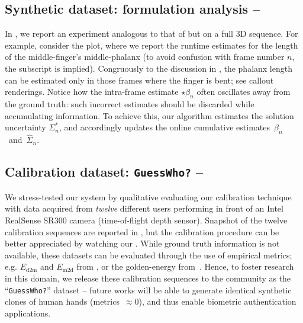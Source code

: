\subsection{Synthetic dataset: formulation analysis -- }
\label{sec:analysis}
In , we report an experiment analogous to that of  but on a full 3D sequence. For example, consider the {\small \todo{$\beta_{[?]}$}} plot, where we report the runtime estimates for the length of the middle-finger's middle-phalanx (to avoid confusion with frame number $n$, the \todo{{\scriptsize $[?]$}} subscript is implied). Congruously to the discussion in , the phalanx length can be estimated only in those frames where the finger is bent; see callout renderings.
Notice how the intra-frame estimate {\small $\star\beta_n$} often oscillates away from the ground truth: 
such incorrect estimates should be discarded while accumulating information. To achieve this, our algorithm estimates the solution uncertainty {\small $\Sigma^*_n$}, and accordingly updates the online cumulative estimates~{\small $\hat\beta_n$}~and~{\small $\hat\Sigma_n$}.

\subsection{Calibration dataset: \texttt{GuessWho?} -- }
\label{sec:evaldataset}
We stress-tested our system by qualitative evaluating our calibration technique with data acquired from \emph{twelve} different users performing in front of an Intel RealSense SR300 camera (time-of-flight depth sensor). 
Snapshot of the twelve calibration sequences are reported in , but the calibration procedure can be better appreciated by watching our \VideoQualitative{}.
While ground truth information is not available, these datasets can be evaluated through the use of empirical metrics; e.g. $E_\text{d2m}$ and $E_\text{m2d}$ from \cite{tkach2016sphere}, or the golden-energy from~\cite{taylor2016joint}.
Hence, to foster research in this domain, we release these calibration sequences to the community as the ``\texttt{GuessWho?}'' dataset -- future works will be able to generate identical synthetic clones of human hands (metrics~$\approx 0$), and thus enable biometric authentication applications.


